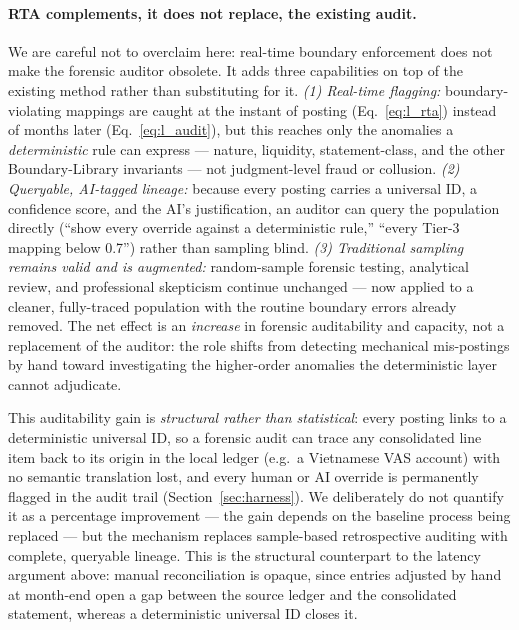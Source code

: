 \paragraph{RTA complements, it does not replace, the existing audit.} We are
careful not to overclaim here: real-time boundary enforcement does not make the
forensic auditor obsolete. It adds three capabilities on top of the existing
method rather than substituting for it. \emph{(1) Real-time flagging:}
boundary-violating mappings are caught at the instant of posting
(Eq.~\ref{eq:l_rta}) instead of months later (Eq.~\ref{eq:l_audit}), but this
reaches only the anomalies a \emph{deterministic} rule can express ---
nature, liquidity, statement-class, and the other Boundary-Library invariants
--- not judgment-level fraud or collusion. \emph{(2) Queryable, AI-tagged
lineage:} because every posting carries a universal ID, a confidence score,
and the AI's justification, an auditor can query the population directly
(``show every override against a deterministic rule,'' ``every Tier-3 mapping
below 0.7'') rather than sampling blind. \emph{(3) Traditional sampling remains
valid and is augmented:} random-sample forensic testing, analytical review,
and professional skepticism continue unchanged --- now applied to a cleaner,
fully-traced population with the routine boundary errors already removed. The
net effect is an \emph{increase} in forensic auditability and capacity, not a
replacement of the auditor: the role shifts from detecting mechanical
mis-postings by hand toward investigating the higher-order anomalies the
deterministic layer cannot adjudicate.

This auditability gain is \emph{structural rather than statistical}: every
posting links to a deterministic universal ID, so a forensic audit can trace any
consolidated line item back to its origin in the local ledger (e.g.\ a Vietnamese
VAS account) with no semantic translation lost, and every human or AI override is
permanently flagged in the audit trail (Section~\ref{sec:harness}). We
deliberately do not quantify it as a percentage improvement --- the gain depends
on the baseline process being replaced --- but the mechanism replaces
sample-based retrospective auditing with complete, queryable lineage. This is the
structural counterpart to the latency argument above: manual reconciliation is
opaque, since entries adjusted by hand at month-end open a gap between the source
ledger and the consolidated statement, whereas a deterministic universal ID
closes it.

